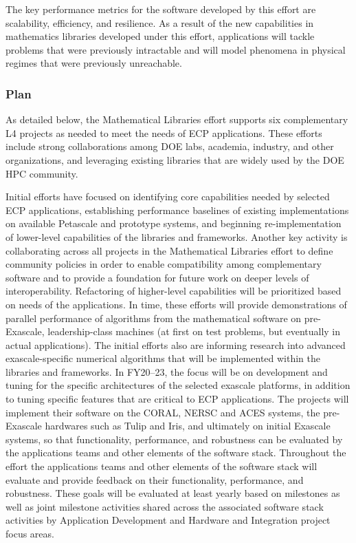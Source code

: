 The key performance metrics for the software developed by this effort are scalability, efficiency, and resilience. As a result of the new capabilities in mathematics libraries developed under this effort, applications will tackle problems that were previously intractable and will model phenomena in physical regimes that were previously unreachable.

\subsubsection{Plan}
As detailed below, the Mathematical Libraries effort supports six complementary L4 projects as needed to meet the needs of ECP applications. These efforts include strong collaborations among DOE labs, academia, industry, and other organizations, and leveraging existing libraries that are widely used by the DOE HPC community. 

Initial efforts have focused on identifying core capabilities needed by selected ECP applications, establishing performance baselines of existing implementations on available Petascale and prototype systems, and beginning re-implementation of lower-level capabilities of the libraries and frameworks. Another key activity is collaborating across all projects in the Mathematical Libraries effort to define community policies in order to enable compatibility among complementary software and to provide a foundation for future work on deeper levels of interoperability. Refactoring of higher-level capabilities will be prioritized based on needs of the applications. In time, these efforts will provide demonstrations of parallel performance of algorithms from the mathematical software on pre-Exascale, leadership-class machines (at first on test problems, but eventually in actual applications). The initial efforts also are informing research into advanced exascale-specific numerical algorithms that will be implemented within the libraries and frameworks. In FY20–23, the focus will be on development and tuning for the specific architectures of the selected exascale platforms, in addition to tuning specific features that are critical to ECP applications. The projects will implement their software on the CORAL, NERSC and ACES systems,
the pre-Exascale hardwares such as Tulip and Iris,
and ultimately on initial Exascale systems, so that functionality, performance, and robustness can be evaluated by the applications teams and other elements of the software stack. Throughout the effort the applications teams and other elements of the software stack will evaluate and provide feedback on their functionality, performance, and robustness. These goals will be evaluated at least yearly based on milestones as well as joint milestone activities shared across the associated software stack activities by Application Development and Hardware and Integration project focus areas.


